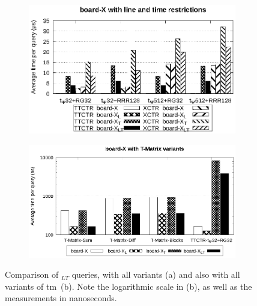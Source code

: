    \begin{figure}[ht]
    \begin{subfigure}{0.5\linewidth}
    \includegraphics[width=\linewidth]{experiments/board.eps}
    \vspace{-12pt}
    \caption{}
    \vspace{-12pt}
    \end{subfigure}%
    \begin{subfigure}{0.5\linewidth}
    \includegraphics[width=\linewidth]{experiments/board_t.eps}
    \vspace{-12pt}
    \caption{}
    \vspace{-12pt}
    \end{subfigure}
    \caption{Comparison of \texttt{\boardX$_{LT}$} queries, with all variants (a) and also with all variants of \acrshort{tm}~(b). Note the logarithmic scale in (b), as well as the measurements in nanoseconds.}
    \label{fig:board}
    \end{figure}
    
